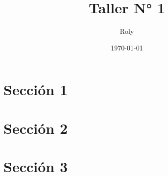\documentclass[a4paper, 11pt]{article}
\title{Taller N° 1}
\author{Roly}
\date{\today}
\begin{document}
    \maketitle

    \section{Sección 1}
        \lipsum[1]
    \section{Sección 2}
        \lipsum[1]
    \section{Sección 3}
        
    
    

    
\end{document}
